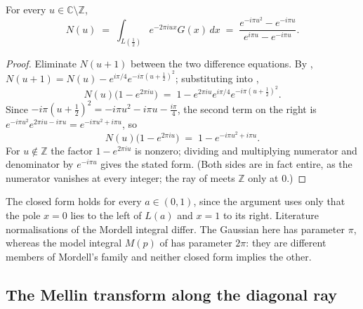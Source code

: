 \begin{theorem}
\label{thm:rsz_mordell}
\leanok
{}
For every $u\in\mathbb{C}\setminus\mathbb{Z}$,
\[
  N(u)\;=\;\int_{L(\frac12)}e^{-2\pi iux}G(x)\,dx
      \;=\;\frac{e^{-i\pi u^{2}}-e^{-i\pi u}}{e^{i\pi u}-e^{-i\pi u}} .
\]
\end{theorem}

\begin{proof}
\leanok
{}
Eliminate $N(u+1)$ between the two difference equations.  By
, $N(u+1)=N(u)-e^{i\pi/4}e^{-i\pi(u+\frac12)^{2}}$; substituting
into ,
\[
  N(u)\bigl(1-e^{2\pi iu}\bigr)\;=\;1-e^{2\pi iu}e^{i\pi/4}e^{-i\pi(u+\frac12)^{2}} .
\]
Since $-i\pi(u+\tfrac12)^{2}=-i\pi u^{2}-i\pi u-\tfrac{i\pi}4$, the second term on the right
is $e^{-i\pi u^{2}}e^{2\pi iu-i\pi u}=e^{-i\pi u^{2}+i\pi u}$, so
\[
  N(u)\bigl(1-e^{2\pi iu}\bigr)\;=\;1-e^{-i\pi u^{2}+i\pi u} .
\]
For $u\notin\mathbb{Z}$ the factor $1-e^{2\pi iu}$ is nonzero; dividing and multiplying
numerator and denominator by $e^{-i\pi u}$ gives the stated form.  (Both sides are in fact
entire, as the numerator vanishes at every integer; the ray of  meets
$\mathbb{Z}$ only at $0$.)
\end{proof}

\begin{remark}[Normalisation]
\label{rem:rsz_mordell_numeric}
The closed form holds for every $a\in(0,1)$, since the argument uses only that the pole $x=0$
lies to the left of $L(a)$ and $x=1$ to its right.  Literature normalisations of the
Mordell integral differ.  The Gaussian here has parameter $\pi$, whereas the model
integral $M(p)$ of  has parameter $2\pi$: they are different members of
Mordell's family and neither closed form implies the other.
\end{remark}

\subsection{The Mellin transform along the diagonal ray}
\label{sec:rsz_mellin}

